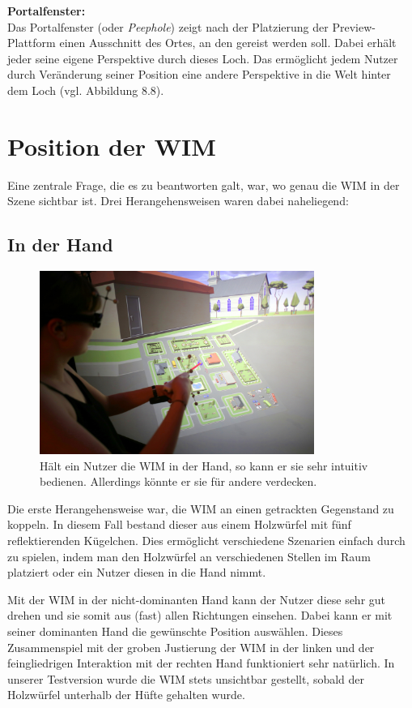 \textbf{Portalfenster:}\\
Das Portalfenster (oder \textit{Peephole}) zeigt nach der Platzierung der Preview-Plattform einen Ausschnitt des Ortes, an den gereist werden soll. Dabei erhält jeder seine eigene Perspektive durch dieses \glqq Loch\grqq{}. Das ermöglicht jedem Nutzer durch Veränderung seiner Position eine andere Perspektive in die Welt \glqq hinter\grqq{} dem Loch (vgl. Abbildung 8.8).

\section{Position der WIM}
Eine zentrale Frage, die es zu beantworten galt, war, wo genau die WIM in der Szene sichtbar ist. Drei Herangehensweisen waren dabei naheliegend:

\subsection{In der Hand}

\begin{figure}[h!]
  \centering
  \includegraphics[width=0.8\textwidth]{images/wim_in_hand.JPG}
  \caption{Hält ein Nutzer die WIM in der Hand, so kann er sie sehr intuitiv bedienen. Allerdings könnte er sie für andere verdecken.}
  \label{fig:todo}
\end{figure}

Die erste Herangehensweise war, die WIM an einen getrackten Gegenstand zu koppeln. In diesem Fall bestand dieser aus einem Holzwürfel mit fünf reflektierenden Kügelchen.
Dies ermöglicht verschiedene Szenarien einfach durch zu spielen, indem man den Holzwürfel an verschiedenen Stellen im Raum platziert oder ein Nutzer diesen in die Hand nimmt.

Mit der WIM in der nicht-dominanten Hand kann der Nutzer diese sehr gut drehen und sie somit aus (fast) allen Richtungen einsehen. Dabei kann er mit seiner dominanten Hand die gewünschte Position auswählen. Dieses Zusammenspiel mit der groben Justierung der WIM in der linken und der feingliedrigen Interaktion mit der rechten Hand funktioniert sehr natürlich.
In unserer Testversion wurde die WIM stets unsichtbar gestellt, sobald der Holzwürfel unterhalb der Hüfte gehalten wurde.

